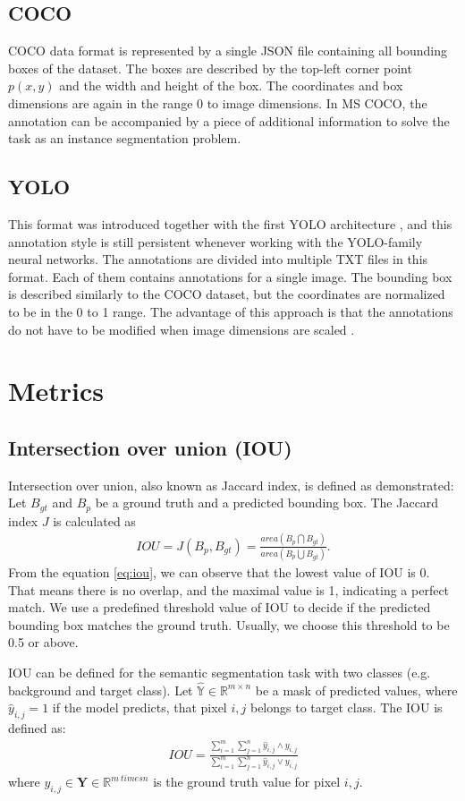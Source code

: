 \subsection{COCO}
COCO data format is represented by a single JSON file containing all bounding boxes of the dataset. The boxes are described by the top-left corner point $p(x,y)$ and the width and height of the box. The coordinates and box dimensions are again in the range 0 to image dimensions. In MS COCO, the annotation can be accompanied by a piece of additional information to solve the task as an instance segmentation problem.
\subsection{YOLO}
This format was introduced together with the first YOLO architecture \cite{Redmon2015}, and this annotation style is still persistent whenever working with the YOLO-family neural networks.
The annotations are divided into multiple TXT files in this format. Each of them contains annotations for a single image.
The bounding box is described similarly to the COCO dataset, but the coordinates are normalized to be in the 0 to 1 range. The advantage of this approach is that the annotations do not have to be modified when image dimensions are scaled \cite{Redmon2015, Padilla2021}.


\section{Metrics}
\subsection{Intersection over union (IOU) }
Intersection over union, also known as Jaccard index, is defined as demonstrated: Let $B_{gt}$ and $B_p$ be a ground truth and a predicted bounding box. The Jaccard index $J$ is calculated as
\begin{align}
    IOU = J(B_p, B_{gt}) = \frac{area(B_p \bigcap B_{gt})}{area(B_p \bigcup B_{gt})}.
    \label{eq:iou}
\end{align}
From the equation \ref{eq:iou}, we can observe that the lowest value of IOU is 0. That means there is no overlap, and the maximal value is 1, indicating a perfect match.
We use a predefined threshold value of IOU to decide if the predicted bounding box matches the ground truth. Usually, we choose this threshold to be 0.5 or above.

IOU can be defined for the semantic segmentation task with two classes (e.g. background and target class). Let $\mathbb{\hat{Y}} \in \mathbb{R}^{m \times n}$ be a mask of predicted values, where $\hat{y}_{i,j} = 1$ if the model predicts, that pixel $i,j$ belongs to target class. The IOU is defined as:
\begin{align}
    IOU = \frac{\sum_{i=1}^{m} \sum_{j=1}^{n} \hat{y}_{i,j} \wedge  y_{i,j}}{\sum_{i=1}^{m} \sum_{j=1}^{n} \hat{y}_{i,j} \vee  y_{i,j}}
\end{align}
where $y_{i,j} \in \mathbf{Y} \in \mathbb{R} ^ {m \ times n}$ is the ground truth value for pixel $i,j$.



